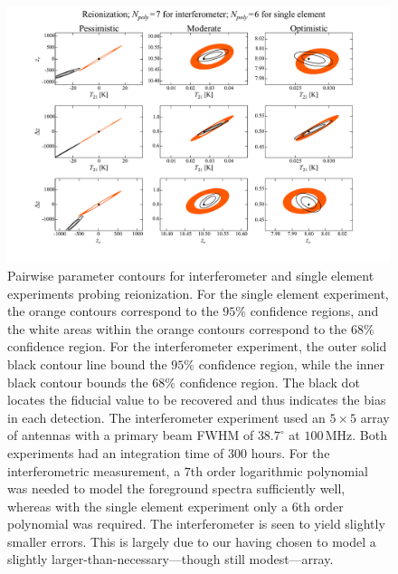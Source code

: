 \documentclass[twocolumn,apj,numberedappendix]{emulateapj}
\newcommand{\acl}[1]{{\color{red} \textbf{[ACL:  #1]}}}
\begin{document}
\begin{figure}[t]
	\centering
	\includegraphics[width=1.00\textwidth,trim=3cm 2cm 3cm 0cm,clip]{figures/reionContoursPoly7Poly6.pdf}
	\caption{Pairwise parameter contours for interferometer and single element experiments probing reionization. For the single element experiment, the orange contours correspond to the $95\%$ confidence regions, and the white areas within the orange contours correspond to the $68\%$ confidence region. For the interferometer experiment, the outer solid black contour line bound the $95\%$ confidence region, while the inner black contour bounds the $68\%$ confidence region. The black dot locates the fiducial value to be recovered and thus indicates the bias in each detection. The interferometer experiment used an $5\times 5$ array of antennas with a primary beam FWHM of $38.7^\circ$ at $100\,\textrm{MHz}$. Both experiments had an integration time of 300 hours. For the interferometric measurement, a $7$th order logarithmic polynomial was needed to model the foreground spectra sufficiently well, whereas with the single element experiment only a $6$th order polynomial was required. The interferometer is seen to yield slightly smaller errors. This is largely due to our having chosen to model a slightly larger-than-necessary---though still modest---array.}
	\label{fig:reionContoursPoly7Poly7}
\end{figure}
\end{document}
